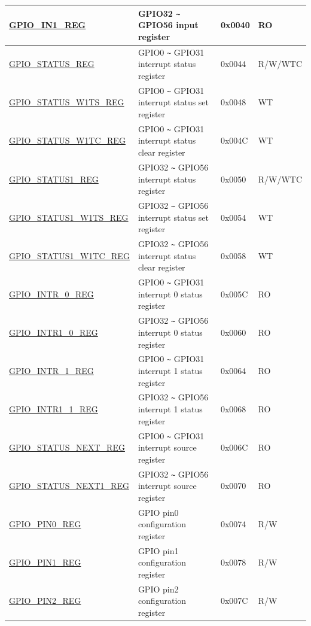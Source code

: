 \begin{longtable}{ | p{5.8cm} | p{7.2cm} | p{1.3cm} | p{2.2cm} | }
\hyperref[regdesc:GPIOIN1REG]{GPIO\_IN1\_REG} & GPIO32 \verb+~+ GPIO56 input register & 0x0040 & RO \\ \hline
\hyperref[regdesc:GPIOSTATUSREG]{GPIO\_STATUS\_REG} & GPIO0 \verb+~+ GPIO31 interrupt status register & 0x0044 & R/W/WTC \\ \hline
\hyperref[regdesc:GPIOSTATUSW1TSREG]{GPIO\_STATUS\_W1TS\_REG} & GPIO0 \verb+~+ GPIO31 interrupt status set register & 0x0048 & WT \\ \hline
\hyperref[regdesc:GPIOSTATUSW1TCREG]{GPIO\_STATUS\_W1TC\_REG} & GPIO0 \verb+~+ GPIO31 interrupt status clear register & 0x004C & WT \\ \hline
\hyperref[regdesc:GPIOSTATUS1REG]{GPIO\_STATUS1\_REG} & GPIO32 \verb+~+ GPIO56 interrupt status register & 0x0050 & R/W/WTC \\ \hline
\hyperref[regdesc:GPIOSTATUS1W1TSREG]{GPIO\_STATUS1\_W1TS\_REG} & GPIO32 \verb+~+ GPIO56 interrupt status set register & 0x0054 & WT \\ \hline
\hyperref[regdesc:GPIOSTATUS1W1TCREG]{GPIO\_STATUS1\_W1TC\_REG} & GPIO32 \verb+~+ GPIO56 interrupt status clear register & 0x0058 & WT \\ \hline
\hyperref[regdesc:GPIOINTR0REG]{GPIO\_INTR\_0\_REG} & GPIO0 \verb+~+ GPIO31 interrupt 0 status register & 0x005C & RO \\ \hline
\hyperref[regdesc:GPIOINTR10REG]{GPIO\_INTR1\_0\_REG} & GPIO32 \verb+~+ GPIO56 interrupt 0 status register & 0x0060 & RO \\ \hline
\hyperref[regdesc:GPIOINTR1REG]{GPIO\_INTR\_1\_REG} & GPIO0 \verb+~+ GPIO31 interrupt 1 status register & 0x0064 & RO \\ \hline
\hyperref[regdesc:GPIOINTR11REG]{GPIO\_INTR1\_1\_REG} & GPIO32 \verb+~+ GPIO56 interrupt 1 status register & 0x0068 & RO \\ \hline
\hyperref[regdesc:GPIOSTATUSNEXTREG]{GPIO\_STATUS\_NEXT\_REG} & GPIO0 \verb+~+ GPIO31 interrupt source register & 0x006C & RO \\ \hline
\hyperref[regdesc:GPIOSTATUSNEXT1REG]{GPIO\_STATUS\_NEXT1\_REG} & GPIO32 \verb+~+ GPIO56 interrupt source register & 0x0070 & RO \\ \hline
\hyperref[regdesc:GPIOPINNREG]{GPIO\_PIN0\_REG} & GPIO pin0 configuration register & 0x0074 & R/W \\ \hline
\hyperref[regdesc:GPIOPINNREG]{GPIO\_PIN1\_REG} & GPIO pin1 configuration register & 0x0078 & R/W \\ \hline
\hyperref[regdesc:GPIOPINNREG]{GPIO\_PIN2\_REG} & GPIO pin2 configuration register & 0x007C & R/W \\ \hline

\end{longtable}
